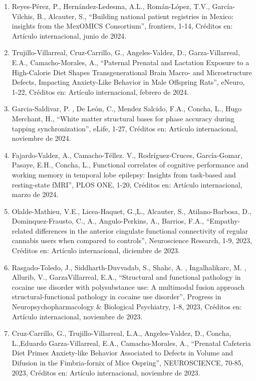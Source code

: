 \begin{enumerate}
\item Reyes-Pérez, P., Hernández-Ledesma, A.L., Román-López, T.V., García-Vilchis, B., Alcauter, S., “Building national 
patient registries in Mexico: insights from the MexOMICS Consortium”, frontiers, 1-14, Créditos en: Artículo internacional, junio de 2024.

\item Trujillo-Villarreal, Cruz-Carrillo, G., Angeles-Valdez, D., Garza-Villarreal, E.A., Camacho-Morales, A., “Paternal 
Prenatal and Lactation Exposure to a High-Calorie Diet Shapes Transgenerational Brain Macro- and Microstructure Defects, 
Impacting Anxiety-Like Behavior in Male Offspring Rats”, eNeuro, 1-22, Créditos en: Artículo internacional, febrero de 
2024.

\item Garcia-Saldivar, P. , De León, C., Mendez Salcido, F.A., Concha, L., Hugo Merchant, H., “White matter structural 
bases 
for phase accuracy during tapping synchronization”, eLife, 1-27, Créditos en: Artículo internacional, noviembre de 2024.

\item Fajardo-Valdez, A., Camacho-Téllez. V., Rodríguez-Cruces, García-Gomar, Pasaye, E.H., Concha, L., Functional 
correlates 
of cognitive performance and working memory in temporal lobe epilepsy: Insights from task-based and resting-state fMRI”, 
PLOS ONE, 1-20, Créditos en: Artículo internacional, marzo de 2024.

\item Olalde-Mathieu, V.E., Licea-Haquet, G.,L., Alcauter, S., Atilano-Barbosa, D., Dominquez-Frausto, C., A., 
Angulo-Perkins, A., Barrios, F.A., “Empathy-related differences in the anterior cingulate functional connectivity of 
regular cannabis users when compared to controls”, Neuroscience Research, 1-9, 2023, Créditos en: Artículo internacional, 
diciembre de 2023.

\item Rasgado-Toledo, J., Siddharth-Duvvadab, S., Shahc, A. , Ingalhalikarc, M. , Allurib, V., GarzaVillarreal, E.A., 
“Structural and functional pathology in cocaine use disorder with polysubstance use: A multimodal fusion approach 
structural-functional pathology in cocaine use disorder”, Progress in Neuropsychopharmacology \& Biological Psychiatry, 
1-8, 
2023, Créditos en: Artículo internacional, noviembre de 2023.

\item Cruz-Carrillo, G., Trujillo-Villarreal, L.A., Angeles-Valdez, D., Concha, L.,Eduardo Garza-Villarreal, E.A., 
Camacho-Morales, A., “Prenatal Cafeteria Diet Primes Anxiety-like Behavior Associated to Defects in Volume and Difusion in 
the Fimbria-fornix of Mice Ospring”, NEUROSCIENCE, 70-85, 2023, Créditos en: Artículo internacional, noviembre de 2023.


\end{enumerate}
